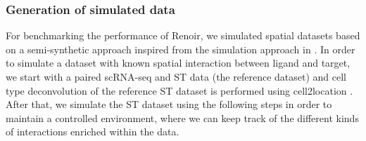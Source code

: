 \subsubsection*{Generation of simulated data}
For benchmarking the performance of Renoir, we simulated spatial datasets based on a semi-synthetic approach inspired from the simulation approach in \citep{Liu2022}. In order to simulate a dataset with known spatial interaction between ligand and target, we start with a paired scRNA-seq and ST data (the reference dataset) and cell type deconvolution of the reference ST dataset is performed using cell2location \citep{Kleshchevnikov2022}. After that, we simulate the ST dataset using the following steps in order to maintain a controlled environment, where we can keep track of the different kinds of interactions enriched within the data. 
